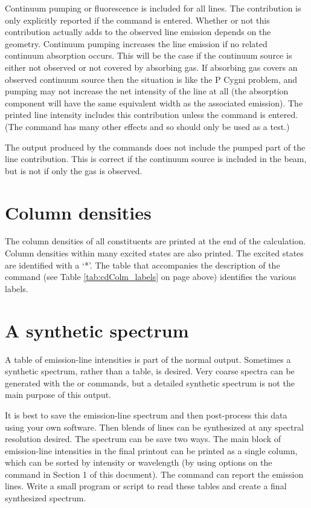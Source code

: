 Continuum pumping or fluorescence is included for all lines.
The contribution is only explicitly reported if the
 command is entered.
Whether or not this contribution actually adds to the observed
line emission depends on the geometry.
Continuum pumping increases the
line emission if no related continuum absorption occurs.
This will be the
case if the continuum source is either not observed or not covered by
absorbing gas.
If absorbing gas covers an observed continuum source then
the situation is like the P Cygni problem, and pumping may not increase
the net intensity of the line at all (the absorption component will have
the same equivalent width as the associated emission).
The printed line
intensity includes this contribution unless the
 command is entered.
(The  command has many other effects and
so should only be used as a test.)

The output produced by the  commands
does not include
the pumped part of the line contribution.
This is correct if the continuum
source is included in the beam, but is not if only the gas is observed.

\section{Column densities}
\label{sec:obs_col_den}

The column densities of all constituents are printed at the end of the
calculation.
Column densities within many excited states are also printed.
The excited states are identified with a `*'.
The table that
accompanies the description of the  command
(see Table \ref{tab:cdColm_labels} on page
\pageref{tab:cdColm_labels} above)
identifies the various labels.

\section{A synthetic spectrum}
\label{sec:obs_syn_spectrum}

A table of emission-line intensities is part of the normal output.
Sometimes a synthetic spectrum, rather than a table, is desired.
Very coarse
spectra can be generated with the  or
 commands,
but a detailed synthetic spectrum is not the main purpose of this output.

It is best to save the emission-line spectrum and then post-process this
data using your own software.  Then blends of lines can be synthesized at
any spectral resolution desired.
The spectrum can be save two ways.
The main block of emission-line intensities in the final printout
can be printed as a single column, which can be sorted by intensity
or wavelength (by using
options on the  command in Section 1 of this document).
The
 command can report the emission lines.
Write a small program or script to read these tables and create a final
synthesized spectrum.

